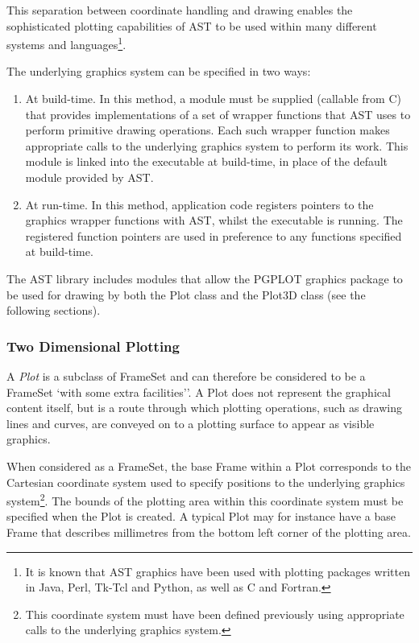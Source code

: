\documentclass[final,authoryear,5p,times,twocolumn]{elsarticle}
\begin{document}
This separation between coordinate handling and drawing enables the
sophisticated plotting capabilities of AST to be used within many
different systems and languages\footnote{It is known that AST graphics
have been used with plotting packages written in Java, Perl, Tk-Tcl and
Python, as well as C and Fortran.}.

The underlying graphics system can be specified in two ways:

\begin{enumerate}
\item At build-time. In this method, a module must be supplied (callable from
C) that provides implementations of a set of wrapper functions that AST
uses to perform primitive drawing operations. Each such wrapper function
makes appropriate calls to the underlying graphics system to perform its
work. This module is linked into the executable at build-time, in place
of the default module provided by AST.
\item At run-time. In this method, application code registers pointers to
the graphics wrapper functions with AST, whilst the executable is running.
The registered function pointers are used in preference to any functions
specified at build-time.
\end{enumerate}

The AST library includes modules that allow the PGPLOT
graphics package \citep[][]{1991BAAS...23..991P} to
be used for drawing by both the Plot class and the Plot3D class (see the
following sections).

\subsubsection{Two Dimensional Plotting}
A \emph{Plot} is a subclass of FrameSet and can therefore be considered
to be a FrameSet `with some extra facilities''. A Plot does not represent
the graphical content itself, but is a route through which plotting
operations, such as drawing lines and curves, are conveyed on to a
plotting surface to appear as visible graphics.

When considered as a FrameSet, the base Frame within a Plot corresponds
to the Cartesian coordinate system used to specify positions to the
underlying graphics system\footnote{This coordinate system must have been
defined previously using appropriate calls to the underlying graphics
system.}. The bounds of the plotting area within this coordinate system must
be specified when the Plot is created. A typical Plot may for instance
have a base Frame that describes millimetres from the bottom left corner
of the plotting area.
\end{document}
